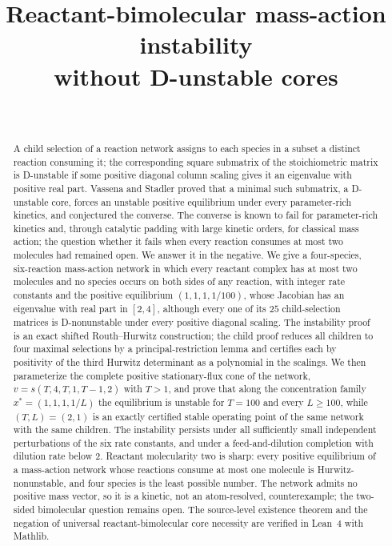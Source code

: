 \documentclass[11pt,a4paper]{article}
\title{Reactant-bimolecular mass-action instability\\ without D-unstable cores}
\author{\PaperAuthor\\ \PaperAffiliation}
\date{\PaperDate}
\theoremstyle{plain}
\theoremstyle{definition}
\theoremstyle{remark}
\newcommand{\xs}{x^{*}}
\begin{document}
\maketitle

\begin{abstract}
A child selection of a reaction network assigns to each species in a subset a distinct reaction consuming it; the corresponding square submatrix of the stoichiometric matrix is D-unstable if some positive diagonal column scaling gives it an eigenvalue with positive real part. Vassena and Stadler proved that a minimal such submatrix, a D-unstable core, forces an unstable positive equilibrium under every parameter-rich kinetics, and conjectured the converse. The converse is known to fail for parameter-rich kinetics and, through catalytic padding with large kinetic orders, for classical mass action; the question whether it fails when every reaction consumes at most two molecules had remained open. We answer it in the negative. We give a four-species, six-reaction mass-action network in which every reactant complex has at most two molecules and no species occurs on both sides of any reaction, with integer rate constants and the positive equilibrium $(1,1,1,1/100)$, whose Jacobian has an eigenvalue with real part in $[2,4]$, although every one of its $25$ child-selection matrices is D-nonunstable under every positive diagonal scaling. The instability proof is an exact shifted Routh--Hurwitz construction; the child proof reduces all children to four maximal selections by a principal-restriction lemma and certifies each by positivity of the third Hurwitz determinant as a polynomial in the scalings. We then parameterize the complete positive stationary-flux cone of the network, $v=s(T,4,T,1,T-1,2)$ with $T>1$, and prove that along the concentration family $\xs=(1,1,1,1/L)$ the equilibrium is unstable for $T=100$ and every $L\ge100$, while $(T,L)=(2,1)$ is an exactly certified stable operating point of the same network with the same children. The instability persists under all sufficiently small independent perturbations of the six rate constants, and under a feed-and-dilution completion with dilution rate below $2$. Reactant molecularity two is sharp: every positive equilibrium of a mass-action network whose reactions consume at most one molecule is Hurwitz-nonunstable, and four species is the least possible number. The network admits no positive mass vector, so it is a kinetic, not an atom-resolved, counterexample; the two-sided bimolecular question remains open. The source-level existence theorem and the negation of universal reactant-bimolecular core necessity are verified in Lean~4 with Mathlib.
\end{abstract}
\end{document}
